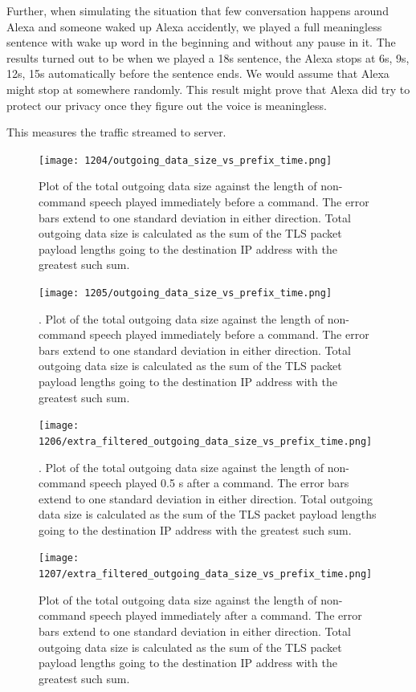 Further, when simulating the situation that few conversation happens around Alexa and someone waked up Alexa accidently, we played a full meaningless sentence with wake up word in the beginning and without any pause in it. The results turned out to be when we played a 18s sentence, the Alexa stops at 6s, 9s, 12s, 15s automatically before the sentence ends. We would assume that Alexa might stop at somewhere randomly. This result might prove that Alexa did try to protect our privacy once they figure out the voice is meaningless.

This measures the traffic streamed to server.


\begin{figure}[]
    \centering
    \texttt{[image: 1204/outgoing\_data\_size\_vs\_prefix\_time.png]}
    \caption{Plot of the total outgoing data size against the length of non-command speech played immediately before a command. The error bars extend to one standard deviation in either direction. Total outgoing data size is calculated as the sum of the TLS packet payload lengths going to the destination IP address with the greatest such sum.}
    \label{fig:prefix_many}
\end{figure}

\begin{figure}[]
    \centering
    \texttt{[image: 1205/outgoing\_data\_size\_vs\_prefix\_time.png]}
    \caption{. Plot of the total outgoing data size against the length of non-command speech played immediately before a command. The error bars extend to one standard deviation in either direction. Total outgoing data size is calculated as the sum of the TLS packet payload lengths going to the destination IP address with the greatest such sum.}
    \label{fig:prefix_two}
\end{figure}

\begin{figure}[]
    \centering
    \texttt{[image: 1206/extra\_filtered\_outgoing\_data\_size\_vs\_prefix\_time.png]}
    \caption{. Plot of the total outgoing data size against the length of non-command speech played 0.5 s after a command. The error bars extend to one standard deviation in either direction. Total outgoing data size is calculated as the sum of the TLS packet payload lengths going to the destination IP address with the greatest such sum.}
    \label{fig:postfix_gap}
\end{figure}

\begin{figure}[]
    \centering
    \texttt{[image: 1207/extra\_filtered\_outgoing\_data\_size\_vs\_prefix\_time.png]}
    \caption{Plot of the total outgoing data size against the length of non-command speech played immediately after a command. The error bars extend to one standard deviation in either direction. Total outgoing data size is calculated as the sum of the TLS packet payload lengths going to the destination IP address with the greatest such sum.}
    \label{fig:postfix_nogap}
\end{figure}


